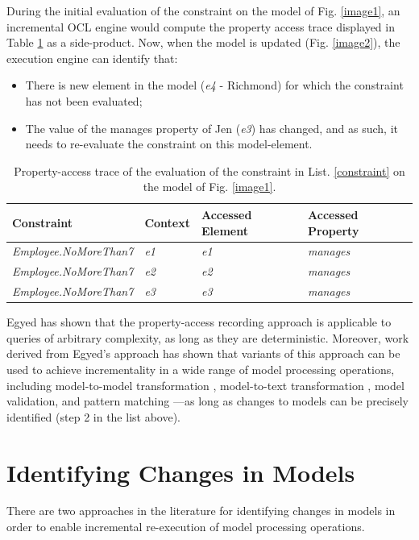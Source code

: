 \documentclass{llncs}
\begin{document}
During the initial evaluation of the constraint on the model of Fig. \ref{image1}, an incremental OCL engine would compute the property access trace displayed in Table \ref{table1} as a side-product. Now, when the model is updated (Fig. \ref{image2}), the execution engine can identify that:

\begin{itemize}
\item There is new element in the model (\emph{e4} - Richmond) for which the constraint has not been evaluated;
\item The value of the manages property of Jen (\emph{e3}) has changed, and as such, it needs to re-evaluate the constraint on this model-element.
\end{itemize}

\begin{table}[h!]
\centering
\caption{Property-access trace of the evaluation of the constraint in List. \ref{constraint} on the model of Fig. \ref{image1}.}
\begin{tabular}{p{4.8cm} p{2.1cm} p{2cm} p{2.1cm}}
\hline 
\textbf{Constraint} & \textbf{Context} & \textbf{Accessed Element} & \textbf{Accessed Property} \\ 
\hline 
\emph{Employee.NoMoreThan7}  & \emph{e1} & \emph{e1} & \emph{manages} \\ 
\emph{Employee.NoMoreThan7}  & \emph{e2} & \emph{e2} & \emph{manages} \\ 
\emph{Employee.NoMoreThan7}  & \emph{e3} & \emph{e3} & \emph{manages} \\ 
\hline 
\end{tabular} 
\label{table1}
\end{table}

Egyed has shown that the property-access recording approach is applicable to queries of arbitrary complexity, as long as they are deterministic. Moreover, work derived from Egyed’s approach has shown that variants of this approach can be used to achieve incrementality in a wide range of model processing operations, including model-to-model transformation \cite{jouault2010towards}, model-to-text transformation \cite{ogunyomi2015property}, model validation, and pattern matching \cite{rath2012derived}---as long as changes to models can be precisely identified (step 2 in the list above).

\section{Identifying Changes in Models}
\label{Identifying Changes in Models}
There are two approaches in the literature for identifying changes in models in order to enable incremental re-execution of model processing operations.
\end{document}
